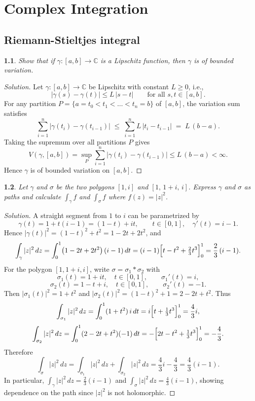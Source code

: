 \documentclass[12pt, a4paper]{report}
\theoremstyle{spaced}
\newtheorem{exercise}{}
\newcommand{\setexercise}[1]{\setcounter{exercise}{#1-1}}
\begin{document}
\chapter{Complex Integration}
\section{Riemann-Stieltjes integral}

\setexercise{6}
\begin{exercise}
	Show that if $\gamma : [a,b] \to \mathbb{C}$ is a Lipschitz function, then $\gamma$ is of bounded variation.
\end{exercise}

\begin{proof}[Solution]
	Let $\gamma:[a,b]\to\mathbb{C}$ be Lipschitz with constant $L\ge 0$, i.e.,
	\[
		|\gamma(s)-\gamma(t)|\le L\,|s-t| \qquad \text{for all } s,t\in[a,b].
	\]
	For any partition $P=\{a=t_0<t_1<\dots<t_n=b\}$ of $[a,b]$, the variation sum satisfies
	\[
		\sum_{i=1}^n \bigl|\gamma(t_i)-\gamma(t_{i-1})\bigr|
		\;\le\; \sum_{i=1}^n L\,|t_i-t_{i-1}|
		\;=\; L\,(b-a).
	\]
	Taking the supremum over all partitions $P$ gives
	\[
		V(\gamma,[a,b])
		=\sup_P \sum_{i=1}^n \bigl|\gamma(t_i)-\gamma(t_{i-1})\bigr|
		\le L\,(b-a)<\infty.
	\]
	Hence $\gamma$ is of bounded variation on $[a,b]$.
\end{proof}


\setexercise{8}
\begin{exercise}
	Let $\gamma$ and $\sigma$ be the two polygons $[1,i]$ and $[1,\,1+i,\,i]$. Express $\gamma$ and $\sigma$ as paths and calculate $\int_\gamma f$ and $\int_\sigma f$ where $f(z)=|z|^{2}$.
\end{exercise}

\begin{proof}[Solution]
	A straight segment from \(1\) to \(i\) can be parametrized by
	\[
		\gamma(t)=1+t(i-1)=(1-t)+it,\qquad t\in[0,1],\quad \gamma'(t)=i-1.
	\]
	Hence \(|\gamma(t)|^2=(1-t)^2+t^2=1-2t+2t^2\), and
	\[
		\int_\gamma |z|^2\,dz
		=\int_0^1 \bigl(1-2t+2t^2\bigr)\,(i-1)\,dt
		=(i-1)\Bigl[t-t^2+\tfrac{2}{3}t^3\Bigr]_0^1
		=\frac{2}{3}\,(i-1).
	\]
	For the polygon \( [1,1+i,i]\), write \(\sigma=\sigma_1*\sigma_2\) with
	\[
		\sigma_1(t)=1+it,\quad t\in[0,1],\qquad \sigma_1'(t)=i,
	\]
	\[
		\sigma_2(t)=1-t+i,\quad t\in[0,1],\qquad \sigma_2'(t)=-1.
	\]
	Then \(|\sigma_1(t)|^2=1+t^2\) and \(|\sigma_2(t)|^2=(1-t)^2+1=2-2t+t^2\). Thus
	\[
		\int_{\sigma_1} |z|^2\,dz=\int_0^1(1+t^2)\,i\,dt
		=i\Bigl[t+\tfrac{1}{3}t^3\Bigr]_0^1=\frac{4}{3}i,
	\]
	\[
		\int_{\sigma_2} |z|^2\,dz=\int_0^1(2-2t+t^2)(-1)\,dt
		=-\Bigl[2t-t^2+\tfrac{1}{3}t^3\Bigr]_0^1=-\frac{4}{3}.
	\]
	Therefore
	\[
		\int_\sigma |z|^2\,dz=\int_{\sigma_1}|z|^2\,dz+\int_{\sigma_2}|z|^2\,dz
		=\frac{4}{3}i-\frac{4}{3}=\frac{4}{3}(i-1).
	\]
	In particular, \(\displaystyle \int_\gamma |z|^2\,dz=\frac{2}{3}(i-1)\) and
	\(\displaystyle \int_\sigma |z|^2\,dz=\frac{4}{3}(i-1)\), showing dependence on the path since \( |z|^2 \) is not holomorphic.
\end{proof}
\end{document}
